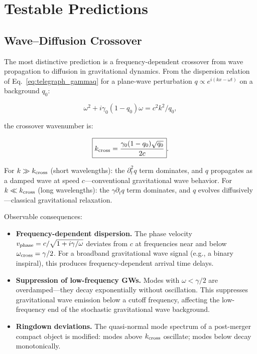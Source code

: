 \documentclass[aps,prd,twocolumn,showpacs,superscriptaddress,preprintnumbers]{revtex4-2}
\begin{document}
\section{Testable Predictions}
\label{sec:predictions}

\subsection{Wave--Diffusion Crossover}

The most distinctive prediction is a frequency-dependent crossover from wave propagation to diffusion in gravitational dynamics.
From the dispersion relation of Eq.~\eqref{eq:telegraph_gammaq} for a plane-wave perturbation $q\propto e^{i(kx-\omega t)}$ on a background $q_0$:

\begin{equation}
\omega^2 + i\gamma_0(1-q_0)\omega = c^2 k^2/q_0,
\label{eq:dispersion}
\end{equation}

the crossover wavenumber is:

\begin{equation}
\boxed{k_{\rm cross} = \frac{\gamma_0(1-q_0)\sqrt{q_0}}{2c}}.
\label{eq:kcross}
\end{equation}

For $k\gg k_{\rm cross}$ (short wavelengths): the $\partial_t^2 q$ term dominates, and $q$ propagates as a damped wave at speed $c$---conventional gravitational wave behavior.
For $k\ll k_{\rm cross}$ (long wavelengths): the $\gamma\partial_t q$ term dominates, and $q$ evolves diffusively---classical gravitational relaxation.

Observable consequences:
\begin{itemize}
    \item \textbf{Frequency-dependent dispersion.} The phase velocity $v_{\rm phase}=c/\sqrt{1+i\gamma/\omega}$ deviates from $c$ at frequencies near and below $\omega_{\rm cross}=\gamma/2$. For a broadband gravitational wave signal (e.g., a binary inspiral), this produces frequency-dependent arrival time delays.

    \item \textbf{Suppression of low-frequency GWs.} Modes with $\omega<\gamma/2$ are overdamped---they decay exponentially without oscillation.
    This suppresses gravitational wave emission below a cutoff frequency, affecting the low-frequency end of the stochastic gravitational wave background.

    \item \textbf{Ringdown deviations.} The quasi-normal mode spectrum of a post-merger compact object is modified: modes above $k_{\rm cross}$ oscillate; modes below decay monotonically.
\end{itemize}
\end{document}
